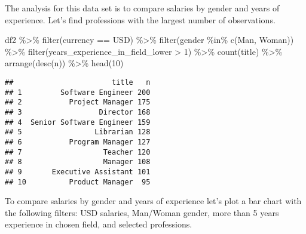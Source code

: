 \documentclass[
]{article}
\newenvironment{Shaded}{\begin{snugshade}}{\end{snugshade}}
\newcommand{\DecValTok}[1]{\textcolor[rgb]{0.00,0.00,0.81}{#1}}
\newcommand{\FunctionTok}[1]{\textcolor[rgb]{0.00,0.00,0.00}{#1}}
\newcommand{\NormalTok}[1]{#1}
\newcommand{\SpecialCharTok}[1]{\textcolor[rgb]{0.00,0.00,0.00}{#1}}
\newcommand{\StringTok}[1]{\textcolor[rgb]{0.31,0.60,0.02}{#1}}
\begin{document}
The analysis for this data set is to compare salaries by gender and
years of experience. Let's find professions with the largest number of
observations.

\begin{Shaded}
\begin{Highlighting}[]
\NormalTok{df2 }\SpecialCharTok{\%\textgreater{}\%} 
    \FunctionTok{filter}\NormalTok{(currency }\SpecialCharTok{==} \StringTok{\textquotesingle{}USD\textquotesingle{}}\NormalTok{) }\SpecialCharTok{\%\textgreater{}\%}
    \FunctionTok{filter}\NormalTok{(gender }\SpecialCharTok{\%in\%} \FunctionTok{c}\NormalTok{(}\StringTok{\textquotesingle{}Man\textquotesingle{}}\NormalTok{, }\StringTok{\textquotesingle{}Woman\textquotesingle{}}\NormalTok{)) }\SpecialCharTok{\%\textgreater{}\%}
    \FunctionTok{filter}\NormalTok{(years\_experience\_in\_field\_lower }\SpecialCharTok{\textgreater{}} \DecValTok{1}\NormalTok{) }\SpecialCharTok{\%\textgreater{}\%}
    \FunctionTok{count}\NormalTok{(title) }\SpecialCharTok{\%\textgreater{}\%} 
    \FunctionTok{arrange}\NormalTok{(}\FunctionTok{desc}\NormalTok{(n)) }\SpecialCharTok{\%\textgreater{}\%}
    \FunctionTok{head}\NormalTok{(}\DecValTok{10}\NormalTok{)}
\end{Highlighting}
\end{Shaded}

\begin{verbatim}
##                       title   n
## 1         Software Engineer 200
## 2           Project Manager 175
## 3                  Director 168
## 4  Senior Software Engineer 159
## 5                 Librarian 128
## 6           Program Manager 127
## 7                   Teacher 120
## 8                   Manager 108
## 9       Executive Assistant 101
## 10          Product Manager  95
\end{verbatim}

To compare salaries by gender and years of experience let's plot a bar
chart with the following filters: USD salaries, Man/Woman gender, more
than 5 years experience in chosen field, and selected professions.
\end{document}
